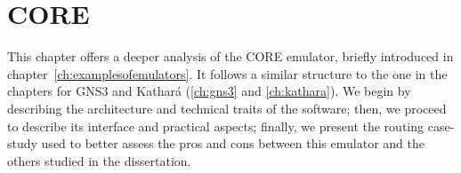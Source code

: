 
\chapter{CORE}
\label{ch:core}

This chapter offers a deeper analysis of the CORE emulator, briefly introduced in chapter~\ref{ch:examplesofemulators}.
It follows a similar structure to the one in the chapters for GNS3 and Kathará (\ref{ch:gns3} and \ref{ch:kathara}).
We begin by describing the architecture and technical traits of the software; then, we proceed to describe its interface and practical aspects; finally, we present the routing case-study used to better assess the pros and cons between this emulator and the others studied in the dissertation.







